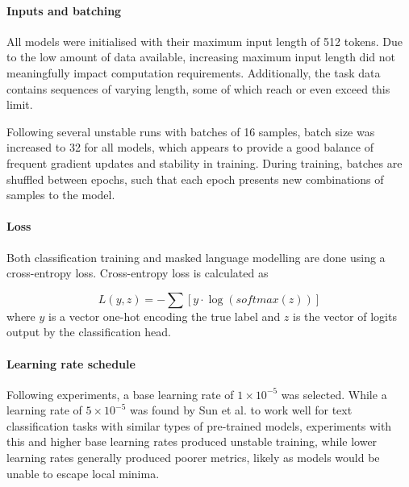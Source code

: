 \documentclass[12pt]{report}
\begin{document}
\paragraph*{Inputs and batching}
All models were initialised with their maximum input length of 512 tokens.
Due to the low amount of data available, increasing maximum input length did not meaningfully impact computation requirements.
Additionally, the task data contains sequences of varying length, some of which reach or even exceed this limit.

Following several unstable runs with batches of 16 samples, batch size was increased to 32 for all models, which appears to provide a good balance of frequent gradient updates and stability in training.
During training, batches are shuffled between epochs, such that each epoch presents new combinations of samples to the model.

\paragraph*{Loss}
Both classification training and masked language modelling are done using a cross-entropy loss.
Cross-entropy loss is calculated as

$$L(y, z) = -\sum\left[y \cdot \log(softmax(z))\right]$$
where $y$ is a vector one-hot encoding the true label and $z$ is the vector of logits output by the classification head.

\paragraph*{Learning rate schedule}
Following experiments, a base learning rate of $1 \times 10^{-5}$ was selected.
While a learning rate of $5 \times 10^{-5}$ was found by Sun et al. \citeyear{Sun2020} to work well for text classification tasks with similar types of pre-trained models, experiments with this and higher base learning rates produced unstable training, while lower learning rates generally produced poorer metrics, likely as models would be unable to escape local minima.
\end{document}
